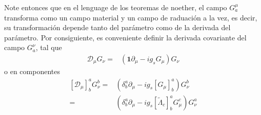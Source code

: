 Note entonces que en el lenguage de los teoremas de noether, el campo $G^{\mu}_{a}$ transforma como un campo material y un campo de raduación a la vez, es decir, su transformación depende tanto del parámetro como de la derivada del parámetro. Por consiguiente, es conveniente definir la derivada covariante del campo $G^{\nu}_{a}$, tal que
\begin{align}
  \mathcal{D}_{\mu}  G_{\nu}=& \left(\mathbf{1}\partial_{\mu}-i g_s  G_{\mu} \right)G_{\nu}
\end{align}
o en componentes
\begin{align}
  \left[ \mathcal{D}_{\mu} \right]^{a}_{b} G_{\nu}^{b}=& \left(\delta^a_b\partial_{\mu}-i g_s \left[ G_{\mu} \right]^{a}_{b} \right)G_{\nu}^{b} \nonumber\\
    =& \left(\delta^a_b\partial_{\mu}-i g_s \left[  \widetilde{\Lambda}_c \right]^a_b G^c_{\mu} \right)G_{\nu}^{a} \nonumber\\
\end{align}
